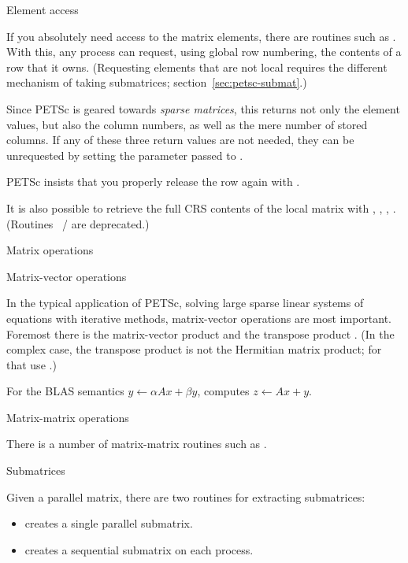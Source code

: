  {Element access}

If you absolutely need access to the matrix elements, there are
routines such as 
.
With this, any process can request, using global row numbering,
the contents of a row that it owns.
(Requesting elements that are not local requires the
different mechanism of taking submatrices; section~\ref{sec:petsc-submat}.)

Since PETSc is geared towards
\emph{sparse matrices},
this returns not only the element values, but also the column numbers,
as well as the mere number of stored columns.
If any of these three return values are not needed, they can be
unrequested by setting the parameter passed to .

PETSc insists that you properly release the row again with
.

It is also possible to retrieve the full \ac{CRS} contents
of the local matrix with
,
,
,
.
(Routines ~/ 
are deprecated.)

 {Matrix operations}

 {Matrix-vector operations}

In the typical application of PETSc, solving large sparse linear
systems of equations with iterative methods, matrix-vector operations
are most important. Foremost there is the matrix-vector product
 and the transpose product
.
(In the complex case, the transpose product is not the Hermitian
matrix product; for that use .)

For the \ac{BLAS}  semantics
$y\leftarrow \alpha Ax + \beta y$,
 computes
$z\leftarrow Ax +y $.

 {Matrix-matrix operations}

There is a number of matrix-matrix routines such as
.

 {Submatrices}
\label{sec:petsc-submat}

Given a parallel matrix, there are two routines for extracting submatrices:
\begin{itemize}
\item {} creates a single parallel
  submatrix.
\item {} creates a sequential
  submatrix on each process.
\end{itemize}

